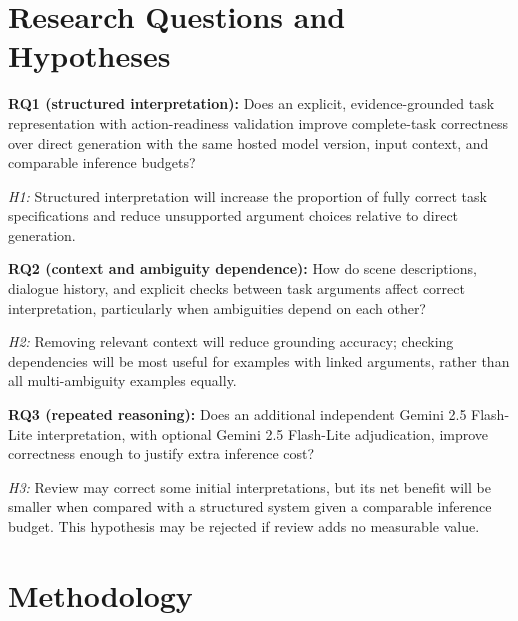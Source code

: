 \documentclass[10pt,conference]{IEEEtran}
\begin{document}
\section{Research Questions and Hypotheses}
\textbf{RQ1 (structured interpretation):} Does an explicit, evidence-grounded task representation with action-readiness validation improve complete-task correctness over direct generation with the same hosted model version, input context, and comparable inference budgets?

\emph{H1:} Structured interpretation will increase the proportion of fully correct task specifications and reduce unsupported argument choices relative to direct generation.

\textbf{RQ2 (context and ambiguity dependence):} How do scene descriptions, dialogue history, and explicit checks between task arguments affect correct interpretation, particularly when ambiguities depend on each other?

\emph{H2:} Removing relevant context will reduce grounding accuracy; checking dependencies will be most useful for examples with linked arguments, rather than all multi-ambiguity examples equally.

\textbf{RQ3 (repeated reasoning):} Does an additional independent Gemini 2.5 Flash-Lite interpretation, with optional Gemini 2.5 Flash-Lite adjudication, improve correctness enough to justify extra inference cost?

\emph{H3:} Review may correct some initial interpretations, but its net benefit will be smaller when compared with a structured system given a comparable inference budget. This hypothesis may be rejected if review adds no measurable value.

\section{Methodology}
\end{document}
